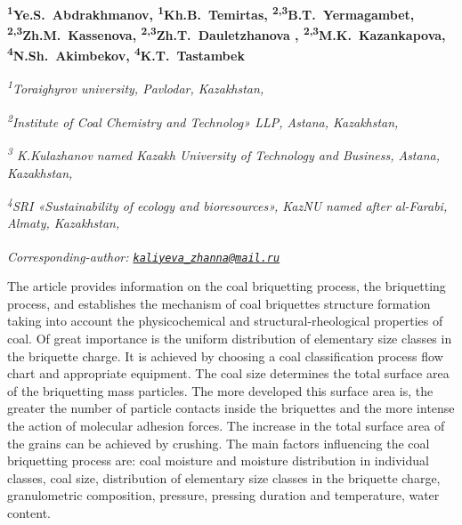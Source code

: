 
\begin{articleheader}

{\bfseries
\textsuperscript{1}Ye.S.~Abdrakhmanov,
\textsuperscript{1}Kh.B.~Temirtas,
\textsuperscript{2,3}B.T.~Yermagambet,
\textsuperscript{2,3}Zh.M.~Kassenova,
\textsuperscript{2,3}Zh.T.~Dauletzhanova\textsuperscript{\envelope } ,
\textsuperscript{2,3}M.K.~Kazankapova,
\textsuperscript{4}N.Sh.~Akimbekov,
\textsuperscript{4}K.T.~Tastambek}
\end{articleheader}

\begin{affiliation}
\emph{\textsuperscript{1}Toraighyrov university, Pavlodar, Kazakhstan,}

\emph{\textsuperscript{2}Institute of Coal Chemistry and Technolog» LLP, Astana, Kazakhstan,}

\emph{\textsuperscript{3} K.Kulazhanov named Kazakh University of Technology and Business, Astana, Kazakhstan,}

\emph{\textsuperscript{4}SRI «Sustainability of ecology and bioresources», KazNU named after al-Farabi, Almaty, Kazakhstan,}

\raggedright \textsuperscript{\envelope }{\em Corresponding-author: \href{mailto:kaliyeva_zhanna@mail.ru}{\nolinkurl{kaliyeva\_zhanna@mail.ru}}}
\end{affiliation}

The article provides information on the coal briquetting process, the
briquetting process, and establishes the mechanism of coal briquettes
structure formation taking into account the physicochemical and
structural-rheological properties of coal. Of great importance is the
uniform distribution of elementary size classes in the briquette charge.
It is achieved by choosing a coal classification process flow chart and
appropriate equipment. The coal size determines the total surface area
of the briquetting mass particles. The more developed this surface area
is, the greater the number of particle contacts inside the briquettes
and the more intense the action of molecular adhesion forces. The
increase in the total surface area of the grains can be achieved by
crushing. The main factors influencing the coal briquetting process are:
coal moisture and moisture distribution in individual classes, coal
size, distribution of elementary size classes in the briquette charge,
granulometric composition, pressure, pressing duration and temperature,
water content.

